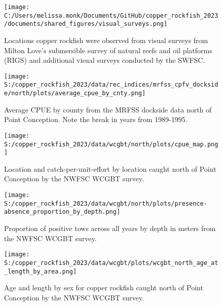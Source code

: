 \documentclass[11pt,
  letterpaper,
]{article}
\begin{document}
\pagebreak

\begin{figure}
{\centering
\texttt{[image: C:/Users/melissa.monk/Documents/GitHub/copper\_rockfish\_2023/documents/shared\_figures/visual\_surveys.png]}
}
\caption{Locations copper rockfish were observed from visual surveys from Milton Love's submersible survey of natural reefs and oil platforms (RIGS) and additional visual surveys conducted by the SWFSC.\label{fig:visual-surveys}}
\end{figure}

\begin{figure}
{\centering
\texttt{[image: S:/copper\_rockfish\_2023/data/rec\_indices/mrfss\_cpfv\_dockside/north/plots/average\_cpue\_by\_cnty.png]}
}
\caption{Average CPUE by county from the MRFSS dockside data north of Point Conception. Note the break in years from 1989-1995.\label{fig:mrfss-cpue-county}}
\end{figure}

\begin{figure}
{\centering
\texttt{[image: S:/copper\_rockfish\_2023/data/wcgbt/north/plots/cpue\_map.png]}
}
\caption{Location and catch-per-unit-effort by location caught north of Point Conception by the NWFSC WCGBT survey.\label{fig:wcgbt-cpue}}
\end{figure}

\pagebreak

\begin{figure}
{\centering
\texttt{[image: S:/copper\_rockfish\_2023/data/wcgbt/north/plots/presence-absence\_proportion\_by\_depth.png]}
}
\caption{Proportion of positive tows across all years by depth in meters from the NWFSC WCGBT survey.\label{fig:wcgbt-depth}}
\end{figure}

\pagebreak

\begin{figure}
{\centering
\texttt{[image: S:/copper\_rockfish\_2023/data/wcgbt/plots/wcgbt\_north\_age\_at\_length\_by\_area.png]}
}
\caption{Age and length by sex for copper rockfish caught north of Point Conception by the NWFSC WCGBT survey.\label{fig:wcgbt-len-age}}
\end{figure}
\end{document}
